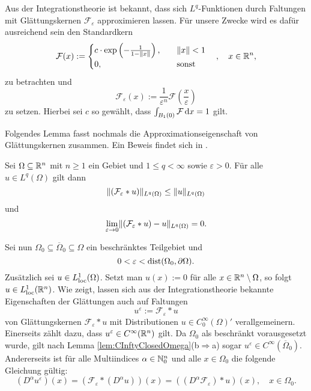 Aus der Integrationstheorie ist bekannt, dass sich $L^q$-Funktionen durch Faltungen mit Glättungskernen $\mathcal{F}_\varepsilon$ approximieren lassen.
Für unsere Zwecke wird es dafür ausreichend sein den Standardkern
$$
\mathcal{F}(x) := \begin{cases}
                     c \cdot \exp\left(-\frac{1}{1 - \lVert x \rVert}\right), \quad &\lVert x \rVert < 1 \\
                     0, \quad  &\text{sonst}
                  \end{cases} \quad,\quad x \in \mathbb{R}^n,
$$
zu betrachten und
$$
\mathcal{F}_\varepsilon(x) := \frac{1}{\varepsilon^n} \mathcal{F}\left(\frac{x}{\varepsilon}\right)
$$ 
zu setzen.
Hierbei sei $c$ so gewählt, dass $\int_{B_1(0)} \mathcal{F} \, {\operatorname{d}\!{x}} = 1$ gilt.

Folgendes Lemma fasst nochmals die Approximationseigenschaft von Glättungskernen zusammen. Ein Beweis findet sich in \cite[S.36, Theorem 2.29(c)]{adams2003sobolev}.
\begin{lem}
  \label{lem:mollification}
  Sei $\Omega \subseteq \mathbb{R}^n$ mit $n \geq 1$ ein Gebiet und $1 \leq q < \infty$ sowie $\varepsilon > 0$.
  Für alle $u \in L^q(\Omega)$ gilt dann
  $$
  \lVert (\mathcal{F}_\varepsilon \ast u) \rVert_{L^q(\Omega)} \leq  \lVert u \rVert_{L^q(\Omega)}
  $$
  und
  \begin{displaymath}
    \lim_{\varepsilon \to 0} \lVert (\mathcal{F}_\varepsilon \ast u) - u \rVert_{L^q(\Omega)} = 0. 
  \end{displaymath}
\end{lem}

Sei nun $\Omega_0 \subseteq \overline\Omega_0 \subseteq \Omega$ ein beschränktes Teilgebiet und
\begin{equation}
  \label{eq:convolutionEpsilon}
  0 < \varepsilon < \operatorname{dist}(\Omega_0, \partial\Omega).
\end{equation}
Zusätzlich sei $u \in L^1_{\operatorname{loc}}(\Omega)$.
Setzt man $u(x) := 0$ für alle $x \in \mathbb{R}^n \setminus \Omega$, so folgt $u \in L^1_{\operatorname{loc}}(\mathbb{R}^n)$.
Wie \cite[S.171, Theorem 6.30(b)]{rudin1991fa} zeigt, lassen sich aus der Integrationstheorie bekannte Eigenschaften der Glättungen auch auf Faltungen 
$$
u^\varepsilon := \mathcal{F}_\varepsilon \ast u
$$
von Glättungskernen $\mathcal{F}_\varepsilon \ast u$ mit Distributionen $u \in C_0^\infty(\Omega)'$ verallgemeinern.
Einerseits zählt dazu, dass $u^\varepsilon \in C^\infty(\mathbb{R}^n)$ gilt.
Da $\Omega_0$ als beschränkt vorausgesetzt wurde, gilt nach Lemma \ref{lem:CInftyClosedOmega}(b$\Rightarrow$a) sogar $u^\varepsilon \in C^\infty(\overline\Omega_0)$.
Andererseits ist für alle Multiindices $\alpha \in \mathbb{N}_0^n$ und alle $x \in \Omega_0$ die folgende Gleichung gültig:
\begin{equation}
  \label{eq:convolutionDiff}
  (D^\alpha u^\varepsilon)(x) 
  = (\mathcal{F}_\varepsilon \ast (D^\alpha u))(x)
  = ( (D^\alpha \mathcal{F}_\varepsilon) \ast u)(x), \quad x \in \Omega_0.
\end{equation}

